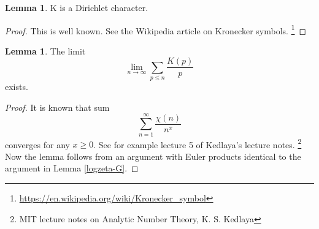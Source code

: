 \documentclass{article}
\theoremstyle{definition}
\newtheorem{lemma}[theorem]{Lemma}
\theoremstyle{remark}
\begin{document}
\begin{lemma}
K is a Dirichlet character.
\end{lemma}
\begin{proof}
This is well known. See the Wikipedia article on Kronecker symbols. \footnote{\url{https://en.wikipedia.org/wiki/Kronecker_symbol}}
\end{proof}

\begin{lemma}\label{Limit from Kedlaya}
The limit
$$\lim_{n \rightarrow \infty}\sum_{p\leq n}\frac{K(p)}{p}$$
exists.
\end{lemma}
\begin{proof}
It is known that sum
$$\sum_{n=1}^{\infty}\frac{\chi(n)}{n^x}$$
converges for any $x \geq 0$. See for example lecture 5 of Kedlaya's lecture notes. \footnote{MIT lecture notes on Analytic Number Theory, K. S. Kedlaya}
Now the lemma follows from an argument with Euler products identical to the argument in Lemma \ref{logzeta-G}.
\end{proof}
\end{document}
